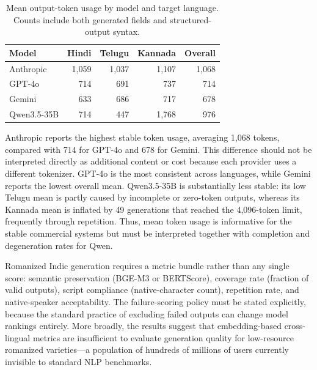 \begin{table}[t]
  \centering
  \caption{Mean output-token usage by model and target language. Counts include
  both generated fields and structured-output syntax.}
  \label{tab:output-tokens}
  \small
  \begin{tabular}{lrrrr}
    \toprule
    Model & Hindi & Telugu & Kannada & Overall \\
    \midrule
    Anthropic      & 1,059 & 1,037 & 1,107 & 1,068 \\
    GPT-4o         &   714 &   691 &   737 &   714 \\
    Gemini         &   633 &   686 &   717 &   678 \\
    Qwen3.5-35B    &   714 &   447 & 1,768 &   976 \\
    \bottomrule
  \end{tabular}
\end{table}

Anthropic reports the highest stable token usage, averaging 1,068 tokens,
compared with 714 for GPT-4o and 678 for Gemini. This difference should not be
interpreted directly as additional content or cost because each provider uses a
different tokenizer. GPT-4o is the most consistent across languages, while
Gemini reports the lowest overall mean. Qwen3.5-35B is substantially less
stable: its low Telugu mean is partly caused by incomplete or zero-token
outputs, whereas its Kannada mean is inflated by 49 generations that reached
the 4,096-token limit, frequently through repetition. Thus, mean token usage is
informative for the stable commercial systems but must be interpreted together
with completion and degeneration rates for Qwen.

\enspace
Romanized Indic generation requires a metric bundle rather than any single
score: semantic preservation (BGE-M3 or BERTScore), coverage rate (fraction
of valid outputs), script compliance (native-character count), repetition rate,
and native-speaker acceptability. The failure-scoring policy must be stated
explicitly, because the standard practice of excluding failed outputs can
change model rankings entirely. More broadly, the results suggest that
embedding-based cross-lingual metrics are insufficient to evaluate generation
quality for low-resource romanized varieties---a population of hundreds of millions of users currently invisible to standard NLP benchmarks.
